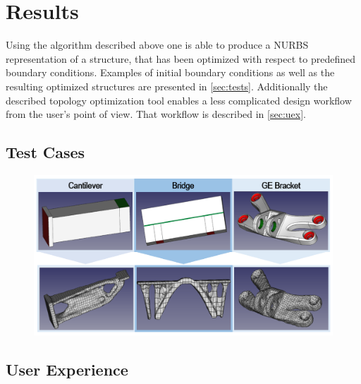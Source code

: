 \chapter{Results}
Using the algorithm described above one is able to produce a NURBS representation of a structure, that has been optimized with respect to predefined boundary conditions. Examples of initial boundary conditions as well as the resulting optimized structures are presented in \autoref{sec:tests}. Additionally the described topology optimization tool enables a less complicated design workflow from the user's point of view. That workflow is described in \autoref{sec:uex}.
\section{Test Cases}
\label{sec:tests}
\begin{figure}[H]
\begin{center}
\includegraphics[width = \textwidth]{Pictures/TestCases.png}
\end{center}
\end{figure}

\section{User Experience}
\label{sec:uex}

